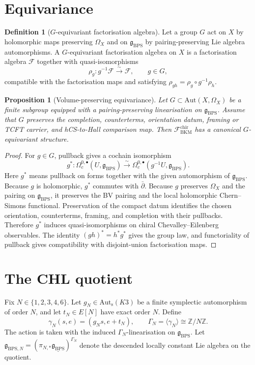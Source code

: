 \documentclass[11pt]{amsart}
\providecommand{\Z}{\mathbb{Z}}
\providecommand{\dbar}{\bar{\partial}}
\providecommand{\gBPS}{\mathfrak{g}_{\mathrm{BPS}}}
\providecommand{\gBPSN}{\mathfrak{g}_{\mathrm{BPS},N}}
\providecommand{\chir}{\mathrm{chir}}
\providecommand{\cF}{\mathcal{F}}
\providecommand{\Aut}{\mathrm{Aut}}
\theoremstyle{plain}
\newtheorem{proposition}[theorem]{Proposition}
\theoremstyle{definition}
\newtheorem{definition}[theorem]{Definition}
\theoremstyle{remark}
\begin{document}
\section{Equivariance}

\begin{definition}[$G$-equivariant factorisation algebra]\label{def:g-equivariant}
Let a group $G$ act on $X$ by holomorphic maps preserving $\Omega_X$ and
on $\gBPS$ by pairing-preserving Lie algebra automorphisms. A
$G$-equivariant factorisation algebra on $X$ is a factorisation algebra
$\cF$ together with quasi-isomorphisms
\[
 \rho_g:g^{-1}\cF\xrightarrow{\sim}\cF,\qquad g\in G,
\]
compatible with the factorisation maps and satisfying
$\rho_{gh}=\rho_g\circ g^{-1}\rho_h$.
\end{definition}

\begin{proposition}[Volume-preserving equivariance]\label{prop:volume-equivariance}
Let $G\subset\Aut(X,\Omega_X)$ be a finite subgroup equipped with a
pairing-preserving linearisation on $\gBPS$. Assume that $G$ preserves
the completion, counterterms, orientation datum, framing or TCFT carrier,
and hCS-to-Hall comparison map. Then
$\cF^{\chir}_{\mathrm{BKM}}$ has a canonical $G$-equivariant structure.
\end{proposition}

\begin{proof}
For $g\in G$, pullback gives a cochain isomorphism
\[
 g^*:\Omega_c^{0,\bullet}(U,\gBPS)
 \xrightarrow{\sim}
 \Omega_c^{0,\bullet}(g^{-1}U,\gBPS).
\]
Here $g^*$ means pullback on forms together with the given automorphism
of $\gBPS$. Because $g$ is holomorphic, $g^*$ commutes with $\dbar$.
Because $g$ preserves $\Omega_X$ and the pairing on $\gBPS$, it
preserves the BV pairing and the local holomorphic Chern--Simons
functional. Preservation of the compact datum identifies the chosen
orientation, counterterms, framing, and completion with their pullbacks.
Therefore $g^*$ induces
quasi-isomorphisms on chiral Chevalley--Eilenberg observables. The
identity $(gh)^*=h^*g^*$ gives the group law, and functoriality
of pullback gives compatibility with disjoint-union factorisation
maps.
\end{proof}

\section{The CHL quotient}

Fix $N\in\{1,2,3,4,6\}$. Let $g_N\in\Aut_{\mathrm{s}}(K3)$ be a finite
symplectic automorphism of order $N$, and let $t_N\in E[N]$ have exact
order $N$. Define
\[
 \gamma_N(s,e)=(g_Ns,e+t_N),
 \qquad
 \Gamma_N=\langle\gamma_N\rangle\cong\Z/N\Z .
\]
The action is taken with the induced $\Gamma_N$-linearisation on
$\gBPS$. Let $\gBPSN=(\pi_{N,*}\underline{\gBPS})^{\Gamma_N}$ denote
the descended locally constant Lie algebra on the quotient.
\end{document}
